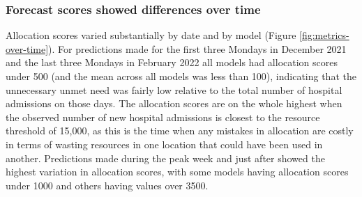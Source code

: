 \documentclass{article}\usepackage[]{graphicx}\usepackage[]{xcolor}
\makeatletter
\newenvironment{kframe}{%
 \def\at@end@of@kframe{}%
 \ifinner\ifhmode%
  \def\at@end@of@kframe{\end{minipage}}%
  \begin{minipage}{\columnwidth}%
 \fi\fi%
 \def\FrameCommand##1{\hskip\@totalleftmargin \hskip-\fboxsep
 \colorbox{shadecolor}{##1}\hskip-\fboxsep
     \hskip-\linewidth \hskip-\@totalleftmargin \hskip\columnwidth}%
 \MakeFramed {\advance\hsize-\width
   \@totalleftmargin\z@ \linewidth\hsize
   \@setminipage}}%
 {\par\unskip\endMakeFramed%
 \at@end@of@kframe}
\newenvironment{knitrout}{}{} %
\makeatother
\begin{document}
\subsubsection{Forecast scores showed differences over time}
\begin{knitrout}
\color{fgcolor}\begin{kframe}


{\ttfamily\noindent\bfseries\color{errorcolor}{\#\# Error in `filter()`:\\\#\# i In argument: `target\_end\_date \%in\%\\\#\# \ \ score\_data\_summaries\$target\_end\_date`.\\\#\# Caused by error in `target\_end\_date \%in\% score\_data\_summaries\$target\_end\_date`:\\\#\# ! object 'score\_data\_summaries' not found}}

{\ttfamily\noindent\bfseries\color{errorcolor}{\#\# Error in ggplot(dat\_to\_plot, aes(x = target\_end\_date, y = value)): object 'dat\_to\_plot' not found}}\end{kframe}
\end{knitrout}


\begin{knitrout}
\color{fgcolor}\begin{kframe}


{\ttfamily\noindent\bfseries\color{errorcolor}{\#\# Error in ggplot(alloscore\_data\_summaries, aes(x = target\_end\_date, y = alloscore, : object 'alloscore\_data\_summaries' not found}}

{\ttfamily\noindent\bfseries\color{errorcolor}{\#\# Error in ggplot(score\_data\_summaries, aes(x = target\_end\_date, y = mwis, : object 'score\_data\_summaries' not found}}

{\ttfamily\noindent\bfseries{}}\end{kframe}
\end{knitrout}

Allocation scores varied substantially by date and by model (Figure \ref{fig:metrics-over-time}).
For predictions made for the first three Mondays in December 2021 and the last three Mondays in February 2022 all models had allocation scores under 500 (and the mean across all models was less than 100), indicating that the unnecessary unmet need was fairly low relative to the total number of hospital admissions on those days.
The allocation scores are on the whole highest when the observed number of new hospital admissions is closest to the resource threshold of 15,000, as this is the time when any mistakes in allocation are costly in terms of wasting resources in one location that could have been used in another.
Predictions made during the peak week and just after showed the highest variation in allocation scores, with some models having allocation scores under 1000 and others having values over 3500.
\end{document}
